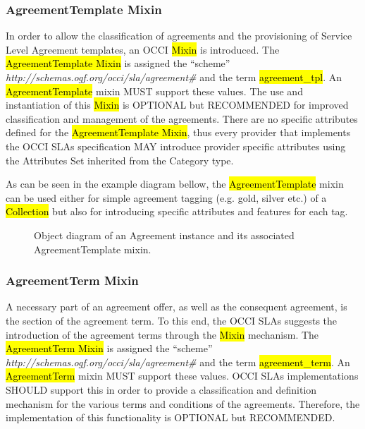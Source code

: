 \documentclass[10pt,a4paper]{article}
\begin{document}
\subsubsection{AgreementTemplate Mixin}
In order to allow the classification of agreements and the provisioning of Service Level Agreement templates, an OCCI \hl{Mixin} is introduced. The \hl{AgreementTemplate Mixin} is assigned the “scheme” \textit{http://schemas.ogf.org/occi/sla/agreement\#} and the term \hl{agreement\_tpl}. An \hl{AgreementTemplate} mixin MUST support these values. The use and instantiation of this \hl{Mixin} is OPTIONAL but RECOMMENDED for improved classification and management of the agreements.  There are no specific attributes defined for the \hl{AgreementTemplate Mixin}, thus every provider that implements the OCCI SLAs specification MAY introduce provider specific attributes using the Attributes Set inherited from the Category type. 

As can be seen in the example diagram bellow, the \hl{AgreementTemplate} mixin can be used either for simple agreement tagging (e.g. gold, silver etc.) of a \hl{Collection} but also for introducing specific attributes and features for each tag.  

\begin{figure}[!h]
	{\centering {} \par}
	\caption{Object diagram of an Agreement instance and its associated AgreementTemplate mixin.}
	\label{fig:template-example}
\end{figure}

\subsubsection{AgreementTerm Mixin}
A necessary part of an agreement offer, as well as the consequent agreement, is the section of the agreement term. To this end, the OCCI SLAs suggests the introduction of the agreement terms through the \hl{Mixin} mechanism. The \hl{AgreementTerm Mixin} is assigned the “scheme” \textit{http://schemas.ogf.org/occi/sla/agreement\#} and the term \hl{agreement\_term}. An \hl{AgreementTerm} mixin MUST support these values. OCCI SLAs implementations SHOULD support this in order to provide a classification and definition mechanism for the various terms and conditions of the agreements. Therefore, the implementation of this functionality is OPTIONAL but RECOMMENDED. 
\end{document}

